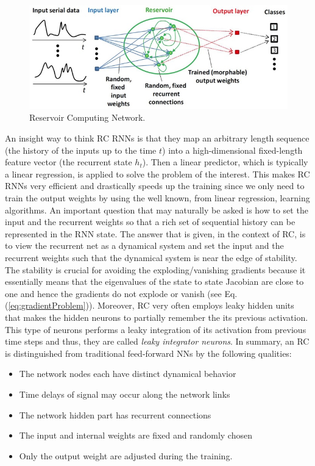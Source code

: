 \documentclass[12pt,letterpaper]{article}
\begin{document}
\begin{figure}[ht!]
\centering
\includegraphics[scale=0.6]{rc.jpg}
\caption{Reservoir Computing Network. \label{fig:rc}}
\end{figure}

An insight way to think RC RNNs is that they map an arbitrary length sequence  (the history of the inputs up to the time $t$)  into a high-dimensional  fixed-length feature vector (the recurrent state $h_t$). Then a linear predictor, which is typically a linear regression, is applied to solve the problem of the interest. This makes RC RNNs very efficient and drastically speeds up the training since we only need to train the output weights by using the well known, from linear regression, learning algorithms. An important question that may naturally be asked is how to set the input and the recurrent weights so that a rich set of sequential history can be represented in the RNN state. The answer that is given, in the context of RC, is to view the recurrent net as a dynamical system and set the input and the recurrent weights such that the dynamical system is near the edge of stability. The stability is crucial for avoiding the exploding/vanishing gradients because it essentially means that  the eigenvalues of the state to state Jacobian are close to one and hence the gradients do not explode  or vanish (see Eq. (\ref{eq:gradientProblem})). Moreover, RC very often employs leaky hidden units that makes the hidden neurons to partially remember the its previous activation.  This type of neurons performs a leaky integration of its activation from previous time steps and thus, they are called \emph{leaky integrator neurons}. In summary, an RC is distinguished from traditional feed-forward NNs by the following qualities:
\begin{itemize}
\item The network nodes each have distinct dynamical behavior
\item Time delays of signal may occur along the network links
\item The network hidden part has recurrent connections
\item The input and internal weights are fixed and randomly chosen
\item Only the output weight are adjusted during the training.
\end{itemize}
\end{document}
